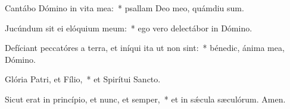 \item Cantábo Dómino in vita mea:~* psallam Deo meo, quámdiu sum.

\item Jucúndum sit ei elóquium meum:~* ego vero delectábor in Dómino.

\item Defíciant peccatóres a terra, et iníqui ita ut non sint:~* bénedic, ánima mea, Dómino.

\item Glória Patri, et Fílio,~* et Spirítui Sancto.

\item Sicut erat in princípio, et nunc, et semper,~* et in sǽcula sæculórum. Amen.

